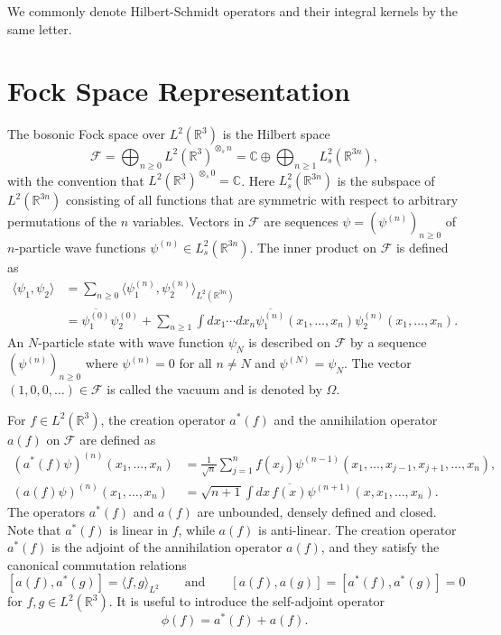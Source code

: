 \documentclass[11pt,a4paper,draft,DIV11]{scrartcl}	%
\newcommand{\R}{\mathds{R}}
\begin{document}
We commonly denote Hilbert-Schmidt operators and their integral kernels by the same letter.

\section{Fock Space Representation}
\label{s:fock}
The bosonic Fock space over $L^2(\R^3)$ is the Hilbert space
\[
  \mathcal{F} = \bigoplus_{n \ge 0} L^2(\R^3)^{\otimes_s n} = \mathds{C}
  \oplus \bigoplus_{n \ge 1} L^2_s(\R^{3n}),
\]
with the convention that $L^2(\R^3)^{\otimes_s 0} = \mathds{C}$. Here
$L^2_s(\R^{3n})$ is the subspace of $L^2(\R^{3n})$ consisting of all functions
that are symmetric with respect to arbitrary permutations of the $n$
variables. Vectors in $\mathcal{F}$ are sequences $\psi = (\psi^{(n)})_{n
\ge 0}$ of $n$-particle wave functions $\psi^{(n)} \in L^2_s(\R^{3n})$. The
inner product on $\mathcal{F}$ is defined as
\begin{align*}
  \langle \psi_1, \psi_2 \rangle & = \sum_{n \ge 0} \langle \psi_1^{(n)},
  \psi_2^{(n)} \rangle_{L^2(\R^{3n})} \\
  & = \overline{\psi_1^{(0)}} \psi_2^{(0)} + \sum_{n \ge 1} \int dx_1 \cdots
  dx_n \overline{\psi_1^{(n)}}(x_1, \dots, x_n) \psi_2^{(n)}(x_1, \dots, x_n).
\end{align*}
An $N$-particle state with wave function $\psi_N$ is described on
$\mathcal{F}$ by a sequence $(\psi^{(n)})_{n \ge 0}$ where $\psi^{(n)} =
0$ for all $n \neq N$ and $\psi^{(N)} = \psi_N$. The vector $(1, 0, 0, \dots
) \in \mathcal{F}$ is called the vacuum and is denoted by $\Omega$.


For $f \in L^2(\R^3)$, the creation operator $a^*(f)$ and the annihilation
operator $a(f)$ on $\mathcal{F}$ are defined as
\[
  \begin{split}
    (a^*(f) \psi)^{(n)}(x_1, \dots, x_n) & = \frac{1}{\sqrt{n}} \sum_{j=1}^n
    f(x_j) \psi^{(n-1)}(x_1, \dots, x_{j-1}, x_{j+1}, \dots, x_n), \\
    (a(f) \psi)^{(n)}(x_1, \dots, x_n) & = \sqrt{n+1} \int dx \,
    \overline{f(x)} \psi^{(n+1)}(x, x_1, \dots, x_n).
  \end{split}
\]
The operators $a^*(f)$ and $a(f)$ are unbounded, densely defined and closed.
Note that $a^*(f)$ is linear in $f$, while $a(f)$ is anti-linear. The creation
operator $a^*(f)$ is the adjoint of the annihilation operator $a(f)$, and
they satisfy the canonical commutation relations
\[
  [a(f), a^*(g)] = \langle f, g \rangle_{L^2} \qquad \text{and} \qquad [a(f),
  a(g)] = [a^*(f), a^*(g)] = 0
\]
for $f,g \in L^2(\R^3)$. It is useful to introduce the self-adjoint operator
\[
  \phi(f) = a^*(f) + a(f).
\]
\end{document}
